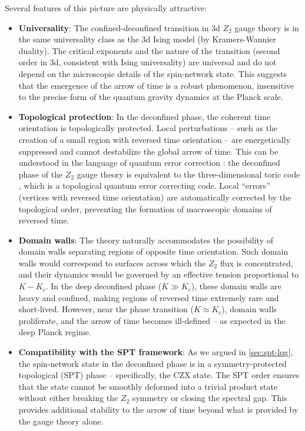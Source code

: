 Several features of this picture are physically attractive:

\begin{itemize}
	\item \textbf{Universality}: The confined-deconfined transition in 3d $ Z_2 $ gauge theory is in the same universality class as the 3d Ising model (by Kramers-Wannier duality). The critical exponents and the nature of the transition (second order in 3d, consistent with Ising universality) are universal and do not depend on the microscopic details of the spin-network state. This suggests that the emergence of the arrow of time is a robust phenomenon, insensitive to the precise form of the quantum gravity dynamics at the Planck scale.

	\item \textbf{Topological protection}: In the deconfined phase, the coherent time orientation is topologically protected. Local perturbations -- such as the creation of a small region with reversed time orientation -- are energetically suppressed and cannot destabilize the global arrow of time. This can be understood in the language of quantum error correction \cite{Dennis2002Topological}: the deconfined phase of the $ Z_2 $ gauge theory is equivalent to the three-dimensional toric code \cite{Dennis2002Topological}, which is a topological quantum error correcting code. Local ``errors'' (vertices with reversed time orientation) are automatically corrected by the topological order, preventing the formation of macroscopic domains of reversed time.

	\item \textbf{Domain walls}: The theory naturally accommodates the possibility of domain walls separating regions of opposite time orientation. Such domain walls would correspond to surfaces across which the $ Z_2 $ flux is concentrated, and their dynamics would be governed by an effective tension proportional to $ K - K_c $. In the deep deconfined phase ($ K \gg K_c $), these domain walls are heavy and confined, making regions of reversed time extremely rare and short-lived. However, near the phase transition ($ K \approx K_c $), domain walls proliferate, and the arrow of time becomes ill-defined -- as expected in the deep Planck regime.

	\item \textbf{Compatibility with the SPT framework}: As we argued in \autoref{sec:spt-lqg}, the spin-network state in the deconfined phase is in a symmetry-protected topological (SPT) phase -- specifically, the CZX state. The SPT order ensures that the state cannot be smoothly deformed into a trivial product state without either breaking the $ Z_2 $ symmetry or closing the spectral gap. This provides additional stability to the arrow of time beyond what is provided by the gauge theory alone.
\end{itemize}


